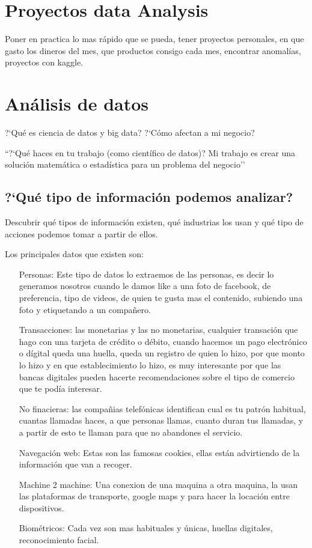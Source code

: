 \chapter{Proyectos data Analysis}
Poner en practica lo mas r\'apido que se pueda, tener proyectos personales, en que gasto los dineros del mes, que productos consigo cada mes, encontrar anomal\'ias, proyectos con kaggle.

\chapter{An\'alisis de datos}

?`Qu\'e es ciencia de datos y big data? ?`C\'omo afectan a mi negocio?

``?`Qu\'e haces en tu trabajo (como cient\'ifico de datos)?
Mi trabajo es crear una soluci\'on matem\'atica o estad\'istica para un problema del negocio''

\section{?`Qu\'e tipo de informaci\'on podemos analizar?}


Descubrir qu\'e tipos de informaci\'on existen, qu\'e industrias los usan y qu\'e tipo de acciones podemos tomar a partir de ellos.

Los principales datos que existen son:

\begin{enumerate}
	\item[Personas:] Este tipo de datos lo extraemos de las personas, es decir lo generamos nosotros cuando le damos like a una foto de facebook, de preferencia, tipo de videos, de quien te gusta mas el contenido, subiendo una foto y etiquetando a un compa\~nero.
	\item[Transacciones:] las monetarias y las no monetarias, cualquier transaci\'on que hago con una tarjeta de cr\'edito o d\'ebito, cuando hacemos un pago electr\'onico o d\'igital  queda una huella, queda un registro de quien lo hizo, por que monto lo hizo y en que establecimiento lo hizo, es muy interesante por que las bancas digitales pueden hacerte recomendaciones sobre el tipo de comercio que te pod\'ia interesar.

		No finacieras: las compa\~nias telef\'onicas identifican cual es tu patr\'on habitual, cuantas llamadas haces, a que personas llamas, cuanto duran tus llamadas, y a partir de esto te llaman para que no abandones el servicio.

	\item[Navegaci\'on web: ] Estas son las famosas cookies, ellas est\'an advirtiendo de la informaci\'on que van a recoger.

	\item[Machine 2 machine: ] Una conexion de una maquina a otra maquina, la usan las plataformas de transporte, google maps y para hacer la locaci\'on entre dispositivos.

	\item[Biom\'etricos: ] Cada vez son mas habituales y \'unicas, huellas digitales, reconocimiento facial.

\end{enumerate}


